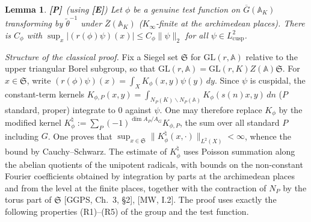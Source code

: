 \documentclass[12pt]{article}
\newcommand{\ov}[1]{\overline{#1}}
\newcommand{\A}{\mathbb{A}}
\newcommand{\GL}{\mathrm{GL}}
\newcommand{\Gb}{\ov{G}}
\newcommand{\Zb}{\ov{Z}}
\newcommand{\Pv}{\textbf{[P]}}
\newcommand{\Ev}{\textbf{[E]}}
\theoremstyle{plain}
\newtheorem{lemma}[theorem]{Lemma}
\theoremstyle{definition}
\begin{document}
\begin{lemma}\label{lem:Bsup}\Pv\ (using \Ev)
Let $\phi$ be a genuine test function on $\Gb(\A_K)$ transforming by $\tilde\theta^{-1}$ under $\Zb(\A_K)$ ($K_\infty$-finite at the archimedean places). There is $C_\phi$ with $\sup_x|(r(\phi)\psi)(x)|\le C_\phi\|\psi\|_2$ for all $\psi\in L^2_{\mathrm{cusp}}$.
\end{lemma}

\emph{Structure of the classical proof.} Fix a Siegel set $\mathfrak S$ for $\GL(r,\A)$ relative to the upper triangular Borel subgroup, so that $\GL(r,\A)=\GL(r,K)Z(\A)\mathfrak S$. For $x\in\mathfrak S$, write $(r(\phi)\psi)(x)=\int_XK_\phi(x,y)\psi(y)\,dy$. Since $\psi$ is cuspidal, the constant-term kernels $K_{\phi,P}(x,y)=\int_{N_P(K)\backslash N_P(\A)}K_\phi(s(n)x,y)\,dn$ ($P$ standard, proper) integrate to $0$ against $\psi$. One may therefore replace $K_\phi$ by the modified kernel $K_\phi^\natural:=\sum_{P}(-1)^{\dim A_P/A_G}K_{\phi,P}$, the sum over all standard $P$ including $G$. One proves that $\sup_{x\in\mathfrak S}\|K^\natural_\phi(x,\cdot)\|_{L^2(X)}<\infty$, whence the bound by Cauchy--Schwarz. The estimate of $K^\natural_\phi$ uses Poisson summation along the abelian quotients of the unipotent radicals, with bounds on the non-constant Fourier coefficients obtained by integration by parts at the archimedean places and from the level at the finite places, together with the contraction of $N_P$ by the torus part of $\mathfrak S$ [GGPS, Ch.~3, \S2], [MW, I.2]. The proof uses exactly the following properties (R1)--(R5) of the group and the test function.
\end{document}
